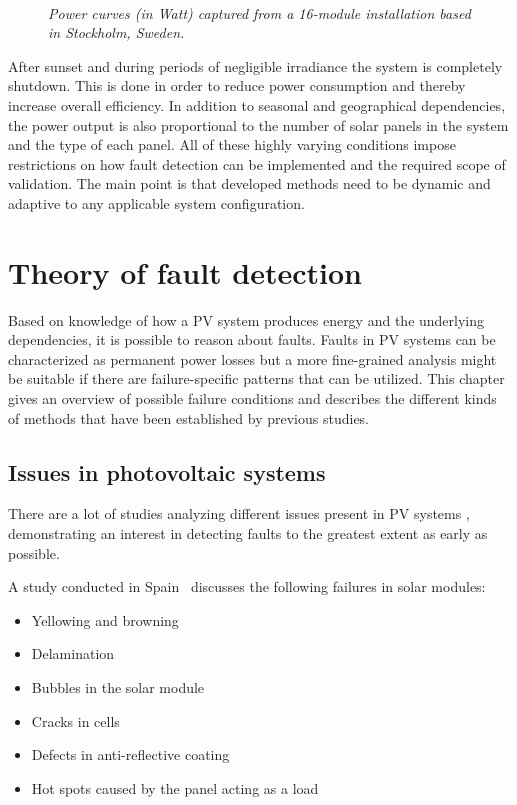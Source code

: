 \begin{figure}[here]
\centering
{}
~
\caption[Power curves captured from an installation]{\emph{Power curves (in Watt) captured from a 16-module installation based in Stockholm, Sweden.}}
\end{figure}

After sunset and during periods of negligible irradiance the system is completely shutdown.
This is done in order to reduce power consumption and thereby increase overall efficiency.
In addition to seasonal and geographical dependencies, the power output is also proportional to the number of solar panels in the system and the type of each panel.
All of these highly varying conditions impose restrictions on how fault detection can be implemented and the required scope of validation.
The main point is that developed methods need to be dynamic and adaptive to any applicable system configuration.

\chapter{Theory of fault detection}
Based on knowledge of how a PV system produces energy and the underlying dependencies,
it is possible to reason about faults.
Faults in PV systems can be characterized as permanent power losses but a more fine-grained analysis might be suitable if there are failure-specific patterns that can be utilized.
This chapter gives an overview of possible failure conditions and describes the different kinds of methods that have been established by previous studies.

\section{Issues in photovoltaic systems}
There are a lot of studies analyzing different issues present in PV systems \cite{Baltus1997,King2002,Petrone2008}, demonstrating an interest in detecting faults to the greatest extent as early as possible.

A study conducted in Spain~\cite{Munoz2011} discusses the following failures in solar modules:
\begin{itemize}
\item Yellowing and browning
\item Delamination
\item Bubbles in the solar module
\item Cracks in cells
\item Defects in anti-reflective coating
\item Hot spots caused by the panel acting as a load
\end{itemize}

